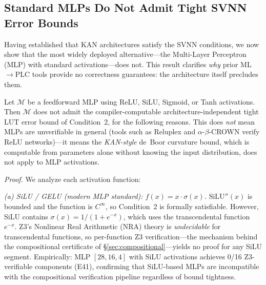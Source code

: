 \subsection{Standard MLPs Do Not Admit Tight SVNN Error Bounds}
\label{sec:svnn-mlp}

Having established that KAN architectures satisfy the SVNN conditions,
we now show that the most widely deployed alternative---the Multi-Layer
Perceptron (MLP) with standard activations---does not. This result
clarifies \textit{why} prior ML$\to$PLC tools provide no correctness
guarantees: the architecture itself precludes them.

\begin{proposition}
\label{prop:mlp_negative}
Let $\mathcal{M}$ be a feedforward MLP using ReLU, SiLU, Sigmoid, or Tanh
activations. Then $\mathcal{M}$ does not admit the compiler-computable
architecture-independent tight LUT error bound of Condition~2, for the
following reasons. This does \emph{not} mean MLPs are unverifiable in
general (tools such as Reluplex and $\alpha$-$\beta$-CROWN verify ReLU
networks)---it means the \emph{KAN-style} de~Boor curvature bound, which
is computable from parameters alone without knowing the input distribution,
does not apply to MLP activations.
\end{proposition}

\vspace{4pt}
\noindent\textit{Proof.} We analyze each activation function:

\vspace{2pt}
\noindent\textit{(a) SiLU / GELU (modern MLP standard): $f(x) = x \cdot \sigma(x)$.}
$\text{SiLU}''(x)$ is bounded and the function is $C^\infty$, so Condition~2
is formally satisfiable. However, SiLU contains $\sigma(x) = 1/(1+e^{-x})$,
which uses the transcendental function $e^{-x}$. Z3's Nonlinear Real
Arithmetic (NRA) theory is \emph{undecidable} for transcendental functions,
so per-function Z3 verification---the mechanism behind the compositional
certificate of {\S}\ref{sec:compositional}---yields no proof for any SiLU segment. Empirically:
MLP $[28,16,4]$ with SiLU activations achieves 0/16 Z3-verifiable
components (E41), confirming that SiLU-based MLPs are incompatible with the
compositional verification pipeline regardless of bound tightness.

